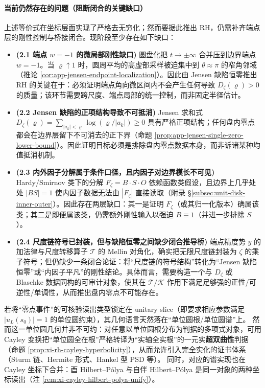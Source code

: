 \paragraph{当前仍然存在的问题（阻断闭合的关键缺口）}
上述等价式在坐标层面实现了严格去无穷化；然而要据此推出 RH，仍需补齐端点层的刚性控制与桥接闭合。现阶段至少存在如下缺口：
\begin{itemize}
  \item \textbf{(2.1 端点 \(w=-1\) 的微局部刚性缺口)} 圆盘化把 \(t\to\pm\infty\) 合并压到边界端点 \(w=-1\)。当 \(\varrho\uparrow 1\) 时，圆周平均的高虚部采样被迫集中到 \(\theta\approx\pi\) 的窄角邻域（推论 \ref{cor:app-jensen-endpoint-localization}）。因此由 Jensen 缺陷恒零推出 RH 的关键在于：必须证明端点角向微区间内不会产生任何导致 \(D_{\zeta}(\varrho)>0\) 的质量；该环节需要跨尺度、端点局部的统一控制，而非固定半径估计。
  \item \textbf{(2.2 Jensen 缺陷的正项结构导致不可抵消)} Jensen 求和式
  \(D_{\zeta}(\varrho)=\sum_{|a_k|<\varrho}\log(\varrho/|a_k|)\ge 0\)
  具有严格正项结构；任何盘内零点都会在边界层留下不可消去的正下界（命题 \ref{prop:app-jensen-single-zero-lower-bound}）。因此证明目标必须是排除盘内零点数据本身，而非诉诸某种均值抵消机制。
  \item \textbf{(2.3 内外因子分解属于条件口径，且内因子对边界模长不可见)} Hardy/Smirnov 类下的分解 \(F_{\zeta}=B\cdot S\cdot O\) 依赖函数类假设，且边界上几乎处处 \(|BS|=1\) 使内因子数据无法由 \(|F_{\zeta}|\) 直接读取（附录 \S\ref{subsec:unit-disk-inner-outer}）。因此存在两层缺口：其一是证明 \(F_{\zeta}\)（或其归一化版本）确属该类；其二是即便属该类，仍需额外刚性输入以强迫 \(B\equiv 1\)（并进一步排除 \(S\)）。
  \item \textbf{(2.4 尺度链符号已封装，但与缺陷恒零之间缺少闭合推导桥)} 端点精度势 \(y\) 的加法律与尺度转移算子 \(\mathcal{T}\) 的 Mellin 对角化，确实把无限尺度链封装为 \(\zeta\) 的乘子符号；但仍缺少一条闭合论证：将“尺度链的符号结构”转化为“Jensen 缺陷恒零”或“内因子平凡”的刚性结论。具体而言，需要构造一个与 \(D_{\zeta}\) 或 Blaschke 数据同构的可审计对象，使其在 \(\mathcal{T}/\mathcal{K}\) 作用下满足足够强的正性/可逆性/单调性，从而推出盘内零点不可能存在。
\end{itemize}

\begin{remark}\label{rem:bridge-rh-cayley-hyperbolicity}
若将“零点事件”的可核验读出类型锁定在 unitary slice（即要求相应参数满足 \(|u_L(s_0)|=1\) 的单位圆约束），其几何语言天然落在“单位圆根/单位圆谱”上。
然而这一单位圆几何并非不可约：对任意以单位圆根分布为判据的多项式对象，可用 Cayley 变换把“单位圆全在根”严格转译为“实轴全实根”的一元实\textbf{超双曲性}判据（命题 \ref{prop:xi-rh-cayley-hyperbolicity}），从而允许引入完全实化的证书体系（Sturm 链、Hermite 形式、Hankel 型 PSD 等）。
同时，对应的谱实现也在 Cayley 坐标下合并：酉 Hilbert--P{\'o}lya 与自伴 Hilbert--P{\'o}lya 是同一对象的两种坐标读出（注 \ref{rem:xi-cayley-hilbert-polya-unify}）。
\end{remark}

